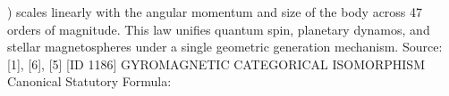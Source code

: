 
\begin{tzpsnapshot}
\end{tzpsnapshot}

) scales linearly with the angular momentum and size of the body across 47 orders of magnitude. This law unifies quantum spin, planetary dynamos, and stellar magnetospheres under a single geometric generation mechanism. Source: [1], [6], [5] [ID 1186] GYROMAGNETIC CATEGORICAL ISOMORPHISM Canonical Statutory Formula:

